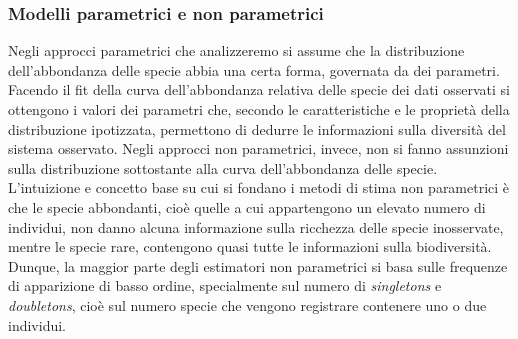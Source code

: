 \subsubsection{Modelli parametrici e non parametrici}
Negli approcci parametrici che analizzeremo si assume che la distribuzione dell'abbondanza delle specie abbia una certa forma, governata da dei parametri. Facendo il fit della curva dell'abbondanza relativa delle specie dei dati osservati si ottengono i valori dei parametri che, secondo le caratteristiche e le proprietà della distribuzione ipotizzata, permettono di dedurre le informazioni sulla diversità del sistema osservato.\newline
Negli approcci non parametrici, invece, non si fanno assunzioni sulla distribuzione sottostante alla curva dell'abbondanza delle specie. L'intuizione e concetto base su cui si fondano i metodi di stima non parametrici è che le specie abbondanti, cioè quelle a cui appartengono un elevato numero di individui, non danno alcuna informazione sulla ricchezza delle specie inosservate, mentre le specie rare, contengono quasi tutte le informazioni sulla biodiversità. Dunque, la maggior parte degli estimatori non parametrici si basa sulle frequenze di apparizione di basso ordine, specialmente sul numero di \emph{singletons} e \emph{doubletons}, cioè sul numero specie che vengono registrare contenere uno o due individui.

